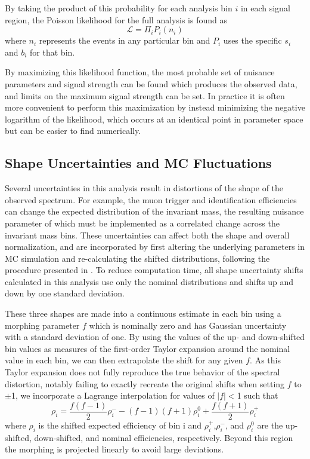 By taking the product of this probability for each analysis bin $i$ in each signal region, the Poisson likelihood for the full analysis is found as
\begin{equation}
	\mathcal{L} = \Pi_{i} P_i (n_i)
\end{equation}
where $n_i$ represents the events in any particular bin and $P_i$ uses the specific $s_i$ and $b_i$ for that bin.

By maximizing this likelihood function, the most probable set of nuisance parameters and signal strength can be found which produces the observed data, and limits on the maximum signal strength can be set.
In practice it is often more convenient to perform this maximization by instead minimizing the negative logarithm of the likelihood, which occurs at an identical point in parameter space but can be easier to find numerically.

\subsection{Shape Uncertainties and MC Fluctuations}
Several uncertainties in this analysis result in distortions of the shape of the observed spectrum. 
For example, the muon trigger and identification efficiencies can change the expected distribution of the invariant mass, the resulting nuisance parameter of which must be implemented as a correlated change across the invariant mass bins.
These uncertainties can affect both the shape and overall normalization, and are incorporated by first altering the underlying parameters in MC simulation and re-calculating the shifted distributions, following the procedure presented in \cite{conway2011}.
To reduce computation time, all shape uncertainty shifts calculated in this analysis use only the nominal distributions and shifts up and down by one standard deviation.

These three shapes are made into a continuous estimate in each bin using a morphing parameter $f$ which is nominally zero and has Gaussian uncertainty with a standard deviation of one.
By using the values of the up- and down-shifted bin values as measures of the first-order Taylor expansion around the nominal value in each bin, we can then extrapolate the shift for any given $f$. 
As this Taylor expansion does not fully reproduce the true behavior of the spectral distortion, notably failing to exactly recreate the original shifts when setting $f$ to $\pm$1, we incorporate a Lagrange interpolation for values of $|f|<$1 such that
\begin{equation}
	\rho_i = \frac{f(f-1)}{2}\rho_{i}^{-} - (f-1)(f+1)\rho_{i}^0 + \frac{f(f+1)}{2}\rho_{i}^{+}
\end{equation}
where $\rho_i$ is the shifted expected efficiency of bin i and $\rho_{i}^+$,$\rho_{i}^-$, and $\rho_{i}^0$ are the up-shifted, down-shifted, and nominal efficiencies, respectively.
Beyond this region the morphing is projected linearly to avoid large deviations. 

